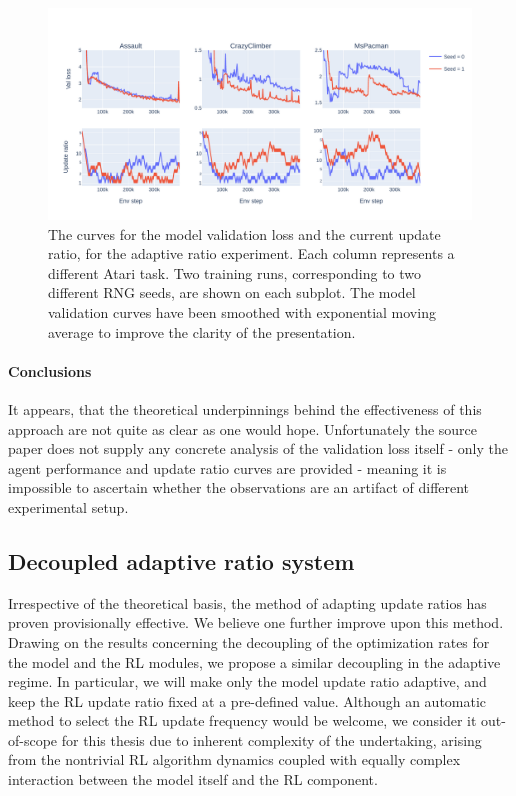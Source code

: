 \documentclass[en]{pracamgr}
\newcommand{\figurewidth}{\linewidth}
\newcommand{\figureheight}{0.8\paperheight}
\begin{document}
\begin{figure}
  \centering
  \includegraphics[width=\figurewidth,height=\figureheight,keepaspectratio]{assets/adaptive_v1_0.curves.pdf}
  \caption{The curves for the model validation loss and the current update ratio, for the adaptive ratio experiment. Each column represents a different Atari task. Two training runs, corresponding to two different RNG seeds, are shown on each subplot. The model validation curves have been smoothed with exponential moving average to improve the clarity of the presentation.}
  \label{fig:adaptive_v1_0_curves}
\end{figure}

\paragraph{Conclusions} It appears, that the theoretical underpinnings behind the effectiveness of this approach are not quite as clear as one would hope. Unfortunately the source paper \autocite{dorkaDynamicUpdatetoDataRatio2023} does not supply any concrete analysis of the validation loss itself - only the agent performance and update ratio curves are provided - meaning it is impossible to ascertain whether the observations are an artifact of different experimental setup.

\subsection{Decoupled adaptive ratio system}

Irrespective of the theoretical basis, the method of adapting update ratios has proven provisionally effective. We believe one further improve upon this method. Drawing on the results concerning the decoupling of the optimization rates for the model and the RL modules, we propose a similar decoupling in the adaptive regime. In particular, we will make only the model update ratio adaptive, and keep the RL update ratio fixed at a pre-defined value. Although an automatic method to select the RL update frequency would be welcome, we consider it out-of-scope for this thesis due to inherent complexity of the undertaking, arising from the nontrivial RL algorithm dynamics coupled with equally complex interaction between the model itself and the RL component.
\end{document}
